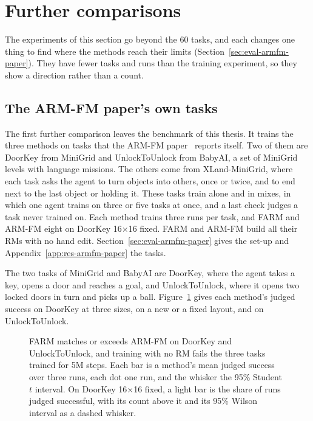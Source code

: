 \documentclass[11pt,english,listoffigures,listoftables]{tfgetsinf}
\begin{document}

\section{Further comparisons}
\label{sec:res-further}

The experiments of this section go beyond the 60 tasks, and each changes one thing to find where the methods reach their limits (Section~\ref{sec:eval-armfm-paper}). They have fewer tasks and runs than the training experiment, so they show a direction rather than a count.

\subsection{The ARM-FM paper's own tasks}
\label{sec:res-armfm-paper}

The first further comparison leaves the benchmark of this thesis. It trains the three methods on tasks that the ARM-FM paper~\cite{creus2026armfm} reports itself.
Two of them are DoorKey from MiniGrid and UnlockToUnlock from BabyAI, a set of MiniGrid levels with language missions. The others come from XLand-MiniGrid, where each task asks the agent to turn objects into others, once or twice, and to end next to the last object or holding it. These tasks train alone and in mixes, in which one agent trains on three or five tasks at once, and a last check judges a task never trained on. Each method trains three runs per task, and FARM and ARM-FM eight on DoorKey 16$\times$16 fixed. FARM and ARM-FM build all their RMs with no hand edit. Section~\ref{sec:eval-armfm-paper} gives the set-up and Appendix~\ref{app:res-armfm-paper} the tasks.

The two tasks of MiniGrid and BabyAI are DoorKey, where the agent takes a key, opens a door and reaches a goal, and UnlockToUnlock, where it opens two locked doors in turn and picks up a ball. Figure~\ref{fig:res-armfm-paper} gives each method's judged success on DoorKey at three sizes, on a new or a fixed layout, and on UnlockToUnlock.

\begin{figure}[!htb]
\centering

\caption[Judged success on the paper's MiniGrid tasks]{FARM matches or exceeds ARM-FM on DoorKey and UnlockToUnlock, and training with no RM fails the three tasks trained for 5M steps. Each bar is a method's mean judged success over three runs, each dot one run, and the whisker the 95\% Student $t$ interval. On DoorKey 16$\times$16 fixed, a light bar is the share of runs judged successful, with its count above it and its 95\% Wilson interval as a dashed whisker.}
\label{fig:res-armfm-paper}
\end{figure}
\end{document}
